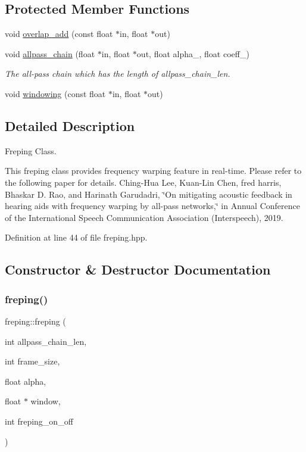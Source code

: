 \subsection*{Protected Member Functions}
\begin{DoxyCompactItemize}
\item 
void \hyperlink{classfreping_abf4dad3740451d41a9462b1994df09bd}{overlap\+\_\+add} (const float $\ast$in, float $\ast$out)
\item 
void \hyperlink{classfreping_a5ac5fad6ea8f20a8ced37c05b779f077}{allpass\+\_\+chain} (float $\ast$in, float $\ast$out, float alpha\+\_\+, float coeff\+\_\+)
\begin{DoxyCompactList}\small\item\em The all-\/pass chain which has the length of allpass\+\_\+chain\+\_\+len. \end{DoxyCompactList}\item 
void \hyperlink{classfreping_a68ae299fddc13981c0dacc2b7d2bb06f}{windowing} (const float $\ast$in, float $\ast$out)
\end{DoxyCompactItemize}


\subsection{Detailed Description}
Freping Class. 

This freping class provides frequency warping feature in real-\/time. Please refer to the following paper for details. Ching-\/\+Hua Lee, Kuan-\/\+Lin Chen, fred harris, Bhaskar D. Rao, and Harinath Garudadri, \char`\"{}\+On mitigating acoustic feedback in hearing aids with frequency warping by all-\/pass networks,\char`\"{} in Annual Conference of the International Speech Communication Association (Interspeech), 2019. 

Definition at line 44 of file freping.\+hpp.



\subsection{Constructor \& Destructor Documentation}
\mbox{\label{classfreping_a2df9985dad679cb5f796d75367b28b2c}} 
\subsubsection{\texorpdfstring{freping()}{freping()}}
{\footnotesize\ttfamily freping\+::freping (\begin{DoxyParamCaption}\item[{int}]{allpass\+\_\+chain\+\_\+len,  }\item[{int}]{frame\+\_\+size,  }\item[{float}]{alpha,  }\item[{float $\ast$}]{window,  }\item[{int}]{freping\+\_\+on\+\_\+off }\end{DoxyParamCaption})\hspace{0.3cm}{\ttfamily [explicit]}}



